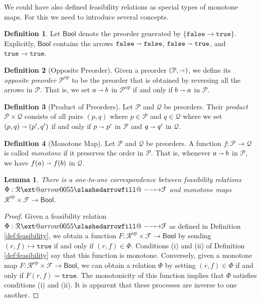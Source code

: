 \documentclass[12pt]{article}
\makeatletter
\theoremstyle{definition}
\newtheorem{definition}{Definition}[section]
\theoremstyle{plain}
\newtheorem{lemma}{Lemma}[section]
\theoremstyle{plain}
\theoremstyle{plain}
\theoremstyle{plain}
\theoremstyle{remark}
\theoremstyle{remark}
\newcommand{\mc}[1]{\mathcal{#1}}
\newcommand{\true}{\mathtt{true}}
\newcommand{\false}{\mathtt{false}}
\def\slashedarrowfill@#1#2#3#4#5{%
	$\m@th\thickmuskip0mu\medmuskip\thickmuskip\thinmuskip\thickmuskip
	\relax#5#1\mkern-7mu%
	\cleaders\hbox{$#5\mkern-2mu#2\mkern-2mu$}\hfill
	\mathclap{#3}\mathclap{#2}%
	\cleaders\hbox{$#5\mkern-2mu#2\mkern-2mu$}\hfill
	\mkern-7mu#4$%
}
\def\rightslashedarrowfill@{%
	\slashedarrowfill@\relbar\relbar\mapstochar\rightarrow}
\newcommand\xslashedrightarrow[2][]{%
	\ext@arrow 0055{\rightslashedarrowfill@}{#1}{#2}}
\makeatother
\begin{document}
We could have also defined feasibility relations as special types of monotone maps. For this we need to introduce several concepts.

\begin{definition}
	Let $\mathsf{Bool}$ denote the preorder generated by $\{\false \rightarrow \true\}$. Explicitly, $\mathsf{Bool}$ contains the arrows $\false \shortrightarrow \false$, $\false \shortrightarrow \true$, and $\true \rightarrow \true$.
\end{definition}

\begin{definition}[Opposite Preorder]
	Given a preorder $(\mc{P},\shortrightarrow)$, we define its \emph{opposite preorder} $\mc{P}^\text{op}$ to be the preorder that is obtained by reversing all the arrows in $\mc{P}$. That is, we set $a \shortrightarrow b$ in $\mc{P}^\text{op}$ if and only if $b \shortrightarrow a$ in $\mc{P}$. 
\end{definition}

\begin{definition}[Product of Preorders]
	Let $\mc{P}$ and $\mc{Q}$ be preorders. Their \emph{product} $\mc{P} \times \mc{Q}$ consists of all pairs $(p,q)$ where $p \in \mc{P}$ and $q \in \mc{Q}$ where we set $(p,q) \shortrightarrow (p',q')$ if and only if $p \shortrightarrow p'$ in $\mc{P}$ and $q \shortrightarrow q'$ in $\mc{Q}$.
\end{definition}

\begin{definition}[Monotone Map]
	Let $\mc{P}$ and $\mc{Q}$ be preorders. A function $f: \mc{P} \rightarrow \mc{Q}$ is called \emph{monotone} if it preserves the order in $\mc{P}$. That is, whenever $a \shortrightarrow b$ in $\mc{P}$, we have $f(a) \shortrightarrow f(b)$ in $\mc{Q}$.
\end{definition}

\begin{lemma}
	There is a one-to-one correspondence between feasibility relations $\Phi: \mc{R} \xslashedrightarrow{} \mc{F}$ and monotone maps $\mc{R}^\text{op} \times \mc{F} \rightarrow \mathsf{Bool}$.
\end{lemma}
\begin{proof}
	Given a feasibility relation $\Phi: \mc{R} \xslashedrightarrow{} \mc{F}$ as defined in Definition \ref{def:feasibility}, we obtain a function $F: \mc{R}^\text{op} \times \mc{F} \rightarrow \mathsf{Bool}$ by sending $(r,f) \mapsto \true$ if and only if $(r,f) \in \Phi$. Conditions (i) and (ii) of Definition \ref{def:feasibility} say that this function is monotone. Conversely, given a monotone map $F: \mc{R}^\text{op} \times \mc{F} \rightarrow \mathsf{Bool}$, we can obtain a relation $\Phi$ by setting $(r,f) \in \Phi$ if and only if $F(r,f) = \true$. The monotonicity of this function implies that $\Phi$ satisfies conditions (i) and (ii). It is apparent that these processes are inverse to one another.
\end{proof}
\end{document}
